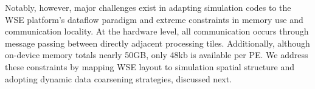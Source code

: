 Notably, however, major challenges exist in adapting simulation codes to the WSE platform's dataflow paradigm and extreme constraints in memory use and communication locality.
At the hardware level, all communication occurs through message passing between directly adjacent processing tiles.
Additionally, although on-device memory totals nearly 50GB, only 48kb is available per PE.
We address these constraints by mapping WSE layout to simulation spatial structure and adopting dynamic data coarsening strategies, discussed next.







